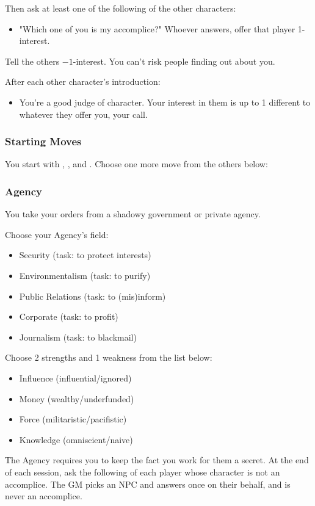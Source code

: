 Then ask at least one of the following of the other characters:
\begin{itemize}
\item "Which one of you is my accomplice?" Whoever answers, offer that player 1-interest.
\end{itemize}
Tell the others $-1$-interest. You can't risk people finding out about you.

After each other character's introduction:
\begin{itemize}
\item You're a good judge of character. Your interest in them is up to 1 different to whatever they offer you, your call.
\end{itemize}

\subsubsection{Starting Moves}
You start with , , and . Choose one more move from the others below:

\subsubsection{Agency}\label{sec:Agency}
You take your orders from a shadowy government or private agency.

Choose your Agency's field:
\begin{itemize}
\item Security (task: to protect interests)
\item Environmentalism (task: to purify)
\item Public Relations (task: to (mis)inform)
\item Corporate (task: to profit)
\item Journalism (task: to blackmail)
\end{itemize}

Choose 2 strengths and 1 weakness from the list below:
\begin{itemize}
\item Influence (influential\slash ignored)
\item Money (wealthy\slash underfunded)
\item Force (militaristic\slash pacifistic)
\item Knowledge (omniscient\slash naive)
\end{itemize}

The Agency requires you to keep the fact you work for them a secret. At the end of each session,
ask the following of each player whose character is not an accomplice.
The GM picks an NPC and answers once on their behalf, and is never an accomplice.

